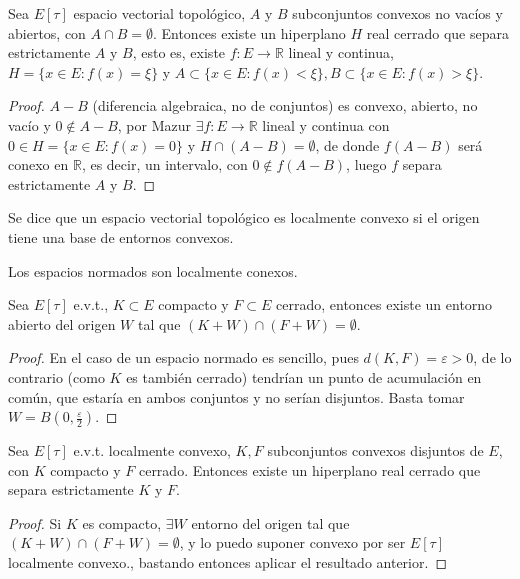 \begin{corollary}
  Sea $E[\tau]$ espacio vectorial topológico, $A$ y $B$ subconjuntos convexos no
  vacíos y abiertos, con $A\cap B= \emptyset$. Entonces existe un hiperplano $H$ 
  real cerrado que separa estrictamente $A$ y $B$, esto es, existe $f:E\to
  \mathbb{R}$ lineal y continua, $H=\{x\in E:f(x)=\xi\} $ y $A\subset \{x\in
  E:f(x)<\xi\}, B\subset \{x\in E:f(x)>\xi\} $.
\end{corollary}

\begin{proof}
  $A-B$ (diferencia algebraica, no de conjuntos) es convexo, abierto, no vacío y
  $0\not\in A-B$, por Mazur $\exists f:E\to \mathbb{R}$ lineal y continua con
  $0\in H=\{x\in E:f(x)=0\} $ y $H\cap (A-B)=\emptyset$, de donde $f(A-B)$ será
  conexo en $\mathbb{R}$, es decir, un intervalo, con $0\not\in f(A-B)$, luego
  $f$ separa estrictamente $A$ y $B$.
\end{proof}

\begin{definition}
  Se dice que un espacio vectorial topológico es localmente convexo si el origen
  tiene una base de entornos convexos.
\end{definition}

\begin{remark}
  Los espacios normados son localmente conexos.
\end{remark}

\begin{lemma}
  Sea $E[\tau]$ e.v.t., $K\subset E$ compacto y $F\subset E$ cerrado, entonces
  existe un entorno abierto del origen $W$ tal que $(K+W)\cap (F+W)=\emptyset$.
\end{lemma}
\begin{proof}
  En el caso de un espacio normado es sencillo, pues  $d(K,F)=\varepsilon>0$, de
  lo contrario (como $K$ es también cerrado) tendrían un punto de acumulación en
  común, que estaría en ambos conjuntos y no serían disjuntos. Basta tomar
  $W=B(0,\frac{\varepsilon}{2})$.
\end{proof}

\begin{corollary}
  Sea $E[\tau]$ e.v.t. localmente convexo, $K,F$ subconjuntos convexos disjuntos
  de $E$, con $K$ compacto y $F$ cerrado. Entonces existe un hiperplano real
  cerrado que separa estrictamente $K$ y $F$.
\end{corollary}

\begin{proof}
  Si $K$ es compacto, $\exists W$ entorno del origen tal que $(K+W)\cap
  (F+W)=\emptyset$, y lo puedo suponer convexo por ser $E[\tau]$ localmente
  convexo., bastando entonces aplicar el resultado anterior.
\end{proof}


